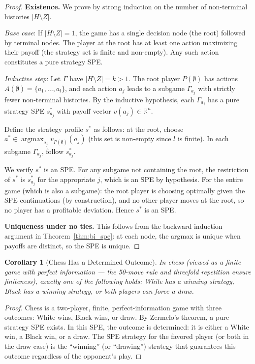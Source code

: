 \documentclass[11pt,a4paper]{article}
\theoremstyle{definition}
\theoremstyle{plain}
\newtheorem{corollary}[theorem]{Corollary}
\theoremstyle{remark}
\newcommand{\R}{\mathbb{R}}
\DeclareMathOperator{\argmax}{argmax}
\begin{document}
\begin{proof}
\textbf{Existence.} We prove by strong induction on the number of non-terminal
histories $|H \setminus Z|$.

\emph{Base case}: If $|H \setminus Z| = 1$, the game has a single decision node (the
root) followed by terminal nodes. The player at the root has at least one action
maximizing their payoff (the strategy set is finite and non-empty). Any such action
constitutes a pure strategy SPE.

\emph{Inductive step}: Let $\Gamma$ have $|H \setminus Z| = k > 1$. The root player
$P(\emptyset)$ has actions $A(\emptyset) = \{a_1, \ldots, a_l\}$, and each action $a_j$
leads to a subgame $\Gamma_{a_j}$ with strictly fewer non-terminal histories. By the
inductive hypothesis, each $\Gamma_{a_j}$ has a pure strategy SPE $s^*_{a_j}$ with
payoff vector $v(a_j) \in \R^n$.

Define the strategy profile $s^*$ as follows: at the root, choose
$a^* \in \argmax_{a_j} v_{P(\emptyset)}(a_j)$ (this set is non-empty since $l$ is
finite). In each subgame $\Gamma_{a_j}$, follow $s^*_{a_j}$.

We verify $s^*$ is an SPE. For any subgame not containing the root, the restriction
of $s^*$ is $s^*_{a_j}$ for the appropriate $j$, which is an SPE by hypothesis.
For the entire game (which is also a subgame): the root player is choosing
optimally given the SPE continuations (by construction), and no other player moves at the
root, so no player has a profitable deviation. Hence $s^*$ is an SPE.

\textbf{Uniqueness under no ties.} This follows from the backward induction argument
in Theorem~\ref{thm:bi_spe}: at each node, the argmax is unique when payoffs are
distinct, so the SPE is unique.
\end{proof}

\begin{corollary}[Chess Has a Determined Outcome]
\label{cor:chess}
In chess (viewed as a finite game with perfect information --- the 50-move rule and
threefold repetition ensure finiteness), exactly one of the following holds: White has
a winning strategy, Black has a winning strategy, or both players can force a draw.
\end{corollary}

\begin{proof}
Chess is a two-player, finite, perfect-information game with three outcomes: White wins,
Black wins, or draw. By Zermelo's theorem, a pure strategy SPE exists. In this SPE,
the outcome is determined: it is either a White win, a Black win, or a draw. The SPE
strategy for the favored player (or both in the draw case) is the ``winning'' (or
``drawing'') strategy that guarantees this outcome regardless of the opponent's play.
\end{proof}
\end{document}
